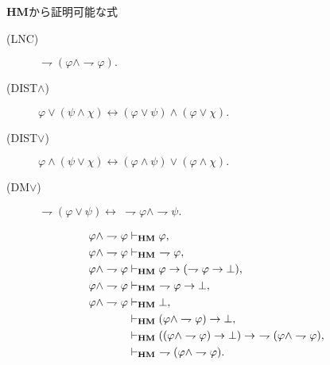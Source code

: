 	{\bf HM}から証明可能な式
	\begin{description}
		\item[(LNC)] $\rightharpoondown (\varphi \wedge \rightharpoondown \varphi).$
		\item[(DIST$\wedge$)] $\varphi \vee (\psi \wedge \chi) 
			\leftrightarrow (\varphi \vee \psi) \wedge (\varphi \vee \chi).$
		\item[(DIST$\vee$)] $\varphi \wedge (\psi \vee \chi) 
			\leftrightarrow (\varphi \wedge \psi) \vee (\varphi \wedge \chi).$
		\item[(DM$\vee$)] $\rightharpoondown (\varphi \vee \psi) \leftrightarrow
			\ \rightharpoondown \varphi \wedge \rightharpoondown \psi.$
	\end{description}
	
	\begin{sketch}[LNC]
		\begin{align}
			\varphi \wedge \rightharpoondown \varphi &\vdash_{{\scriptsize \mbox{{\bf HM}}}} \varphi, \\
			\varphi \wedge \rightharpoondown \varphi &\vdash_{{\scriptsize \mbox{{\bf HM}}}}\ \rightharpoondown \varphi, \\
			\varphi \wedge \rightharpoondown \varphi &\vdash_{{\scriptsize \mbox{{\bf HM}}}}
				\varphi \rightarrow (\rightharpoondown \varphi \rightarrow \bot), \\
			\varphi \wedge \rightharpoondown \varphi &\vdash_{{\scriptsize \mbox{{\bf HM}}}}\ \rightharpoondown \varphi \rightarrow \bot, \\
			\varphi \wedge \rightharpoondown \varphi &\vdash_{{\scriptsize \mbox{{\bf HM}}}} \bot, \\
			&\vdash_{{\scriptsize \mbox{{\bf HM}}}} (\varphi \wedge \rightharpoondown \varphi) \rightarrow \bot, \\
			&\vdash_{{\scriptsize \mbox{{\bf HM}}}} ((\varphi \wedge \rightharpoondown \varphi) \rightarrow \bot)
				\rightarrow\ \rightharpoondown (\varphi \wedge \rightharpoondown \varphi), \\
			&\vdash_{{\scriptsize \mbox{{\bf HM}}}}\ \rightharpoondown (\varphi \wedge \rightharpoondown \varphi).
		\end{align}
		\QED
	\end{sketch}
	
